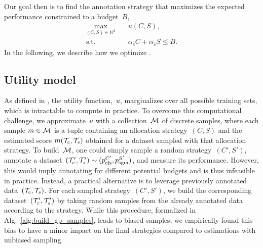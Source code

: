 
Our goal then is to find the annotation strategy that maximizes the expected performance constrained to a budget~$B$,
\begin{equation}
\label{eq:the_optimization}
\begin{aligned}
    \max_{(C,S)\in\mathbb{N}^2} \quad & u(C, S), \\
    \textrm{s.t.} \quad & \alpha_cC+\alpha_sS \le B.
\end{aligned}
\end{equation}
In the following, we describe how we optimize .

\subsection{Utility model}

As defined in , the utility function,~$u$, marginalizes over all possible training sets, which is intractable to compute in practice. To overcome this computational challenge, we approximate~$u$ with a collection~$\mathcal{M}$ of discrete samples, where each sample $m\in\mathcal{M}$ is a tuple containing an allocation strategy~$(C, S)$ and the estimated score $m(\mathcal{T}_c, \mathcal{T}_s)$ obtained for a dataset sampled with that allocation strategy. To build~$\mathcal{M}$, one could simply sample a random strategy~$(C', S')$, annotate a dataset~$(\mathcal{T}'_c, \mathcal{T}'_s)\sim{}(p_\textrm{cls}^{C'}, p_\textrm{sgm}^{S'})$, and measure its performance. However, this would imply annotating for different potential budgets and is thus infeasible in practice. Instead, a practical alternative is to leverage previously annotated data~$(\mathcal{T}_c, \mathcal{T}_s)$. For each sampled strategy~$(C', S')$, we build the corresponding dataset~$(\mathcal{T}'_c, \mathcal{T}'_s)$ by taking random samples from the already annotated data according to the strategy. While this procedure, formalized in Alg.~\ref{alg:build_gp_samples}, leads to biased samples, we empirically found this bias to have a minor impact on the final strategies compared to estimations with unbiased sampling.

